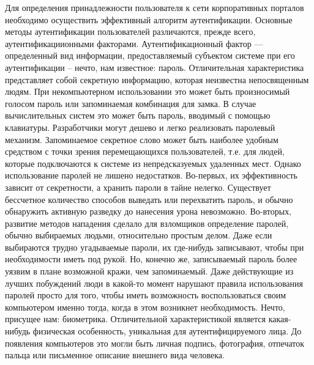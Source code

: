 Для определения принадлежности пользователя к сети корпоративных порталов
необходимо осуществить эффективный алгоритм аутентификации. Основные методы
аутентификации пользователей различаются, прежде всего, аутентификациионными
факторами. Аутентификационный фактор --- определенный вид информации,
предоставляемый субъектом системе при его аутентификации -- нечто, нам
известное: пароль. Отличительная характеристика представляет собой секретную
информацию, которая неизвестна непосвященным людям. При некомпьютерном использовании это
может быть произносимый голосом пароль или запоминаемая комбинация для замка. В
случае вычислительных систем это может быть пароль, вводимый с помощью
клавиатуры. Разработчики могут дешево и легко реализовать паролевый механизм.
Запоминаемое секретное слово может быть наиболее удобным средством с точки
зрения перемещающихся пользователей, т.е. для людей, которые подключаются к
системе из непредсказуемых удаленных мест. Однако использование паролей не
лишено недостатков. Во-первых, их эффективность зависит от секретности, а
хранить пароли в тайне нелегко. Существует бессчетное количество способов
выведать или перехватить пароль, и обычно обнаружить активную разведку до
нанесения урона невозможно. Во-вторых, развитие методов нападения сделало для
взломщиков определение паролей, обычно выбираемых людьми, относительно простым
делом. Даже если выбираются трудно угадываемые пароли, их где-нибудь записывают,
чтобы при необходимости иметь под рукой. Но, конечно же, записываемый пароль
более уязвим в плане возможной кражи, чем запоминаемый. Даже действующие из
лучших побуждений люди в какой-то момент нарушают правила использования паролей
просто для того, чтобы иметь возможность воспользоваться своим компьютером
именно тогда, когда в этом возникнет необходимость. Нечто, присущее нам:
биометрика. Отличительной характеристикой является какая-нибудь физическая
особенность, уникальная для аутентифицируемого лица. До появления компьютеров
это могли быть личная подпись, фотография, отпечаток пальца или письменное
описание внешнего вида человека.~\cite{auth_n_aut}

